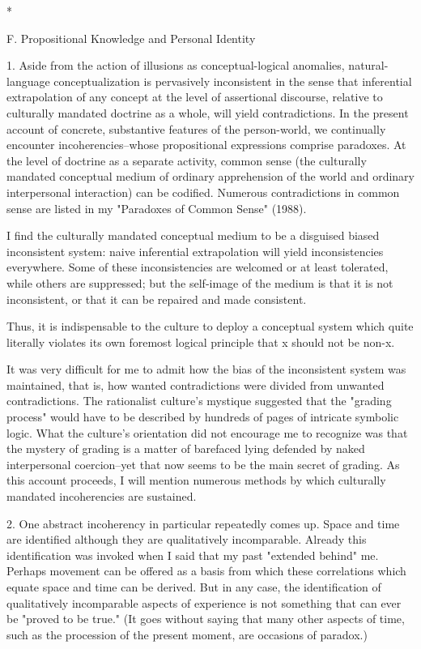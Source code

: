 *

F. Propositional Knowledge and Personal Identity

1. Aside from the action of illusions as conceptual-logical anomalies, natural-language conceptualization is pervasively inconsistent in the sense that inferential extrapolation of any concept at the level of assertional discourse, relative to culturally mandated doctrine as a whole, will yield contradictions. In the present account of concrete, substantive features of the person-world, we continually encounter incoherencies--whose propositional expressions comprise paradoxes. At the level of doctrine as a separate activity, common sense (the culturally mandated conceptual medium of ordinary apprehension of the world and ordinary interpersonal interaction) can be codified. Numerous contradictions in common sense are listed in my "Paradoxes of Common Sense" (1988).

I find the culturally mandated conceptual medium to be a disguised biased inconsistent system: naive inferential extrapolation will yield inconsistencies everywhere. Some of these inconsistencies are welcomed or at least tolerated, while others are suppressed; but the self-image of the medium is that it is not inconsistent, or that it can be repaired and made consistent.

Thus, it is indispensable to the culture to deploy a conceptual system which quite literally violates its own foremost logical principle that x should not be non-x.

It was very difficult for me to admit how the bias of the inconsistent system was maintained, that is, how wanted contradictions were divided from unwanted contradictions. The rationalist culture's mystique suggested that the "grading process" would have to be described by hundreds of pages of intricate symbolic logic. What the culture's orientation did not encourage me to recognize was that the mystery of grading is a matter of barefaced lying defended by naked interpersonal coercion--yet that now seems to be the main secret of grading. As this account proceeds, I will mention numerous methods by which culturally mandated incoherencies are sustained.

2. One abstract incoherency in particular repeatedly comes up. Space and time are identified although they are qualitatively incomparable. Already this identification was invoked when I said that my past "extended behind" me. Perhaps movement can be offered as a basis from which these correlations which equate space and time can be derived. But in any case, the identification of qualitatively incomparable aspects of experience is not something that can ever be "proved to be true." (It goes without saying that many other aspects of time, such as the procession of the present moment, are occasions of paradox.)

